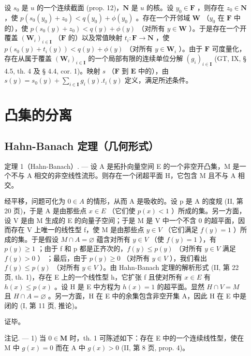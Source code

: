 设 \(s_0\) 是 \(u\) 的一个连续截面 (prop. 12)，\(\mathbf{N}\) 是 \(u\) 的核。设 \(y_0 \in \mathbf{F}\) ，则存在 \(z_0 \in \mathbf{N}\) ，使 \(p(s_0(y_0) + z_0) < q(y_0) + \phi(y_0)\) 。存在一个开邻域 \(\mathbf{W}\) （\(y_0\) 在 \(\mathbf{F}\) 中的），使 \(p(s_0(y) + z_0) < q(y) + \phi(y)\) （对所有 \(y \in \mathbf{W}\) ）。于是存在一个开覆盖 \((\mathbf{W}_i)_{i \in \mathbf{I}}\) （\(\mathbf{F}\) 的）以及常值映射 \(t_i: \mathbf{F} \to \mathbf{N}\) ，使 \(p(s_0(y) + t_i(y)) < q(y) + \phi(y)\) （对所有 \(y \in \mathbf{W}_i\) ）。由于 \(\mathbf{F}\) 可度量化，存在从属于覆盖 \((\mathbf{W}_i)_{i \in \mathbf{I}}\) 的一个局部有限的连续单位分解 \((g_i)_{i \in \mathbf{I}}\) (GT, IX, § 4.5, th. 4 及 § 4.4, cor. 1)。映射 \(s\) （\(\mathbf{F}\) 到 \(\mathbf{E}\) 中的），由 \(s(y) = s_0(y) + \sum_{i \in \mathbf{I}} g_i(y). t_i(y)\) 定义，满足所述条件。

\section{凸集的分离}

\subsection{Hahn-Banach 定理（几何形式）}

定理 1（Hahn-Banach）. --- 设 A 是拓扑向量空间 E 的一个非空开凸集，M 是一个不与 A 相交的非空线性流形。则存在一个闭超平面 H，它包含 M 且不与 A 相交。

经平移，问题可化为 \(0 \in A\) 的情形，从而 A 是吸收的。设 p 是 A 的度规 (II, 第 20 页)，于是 A 是由那些点 \(x \in E\) （它们使 \(p(x) < 1\) ）所成的集。另一方面，设 V 是由 M 生成的 E 的向量子空间；于是 M 是 V 中一个不含 0 的超平面，因而存在 V 上唯一的线性型 f，使 M 是由那些点 \(y \in V\) （它们满足 \(f(y) = 1\) ）所成的集。于是假设 \(M \cap A = \varnothing\) 蕴含对所有 \(y \in V\) （使 \(f(y) = 1\) ），有 \(p(y) \geqslant 1\) ；由于 f 和 p 都是正齐次的，\(f(y) \leqslant p(y)\) （对所有 \(y \in V\) 满足 \(f(y) > 0\) ） ；最后，由于 \(p(y) \geqslant 0\) （对所有 \(y \in V\) ），我们看出 \(f(y) \leqslant p(y)\) （对所有 \(y \in V\) ）。由 Hahn-Banach 定理的解析形式 (II, 第 22 页, th. 1)，存在 E 上的一个线性型 h，它扩张 f 且使对所有 \(x \in E\) 有 \(h(x) \leqslant p(x)\) 。设 H 是 E 中方程为 \(h(x) = 1\) 的超平面。显然 \(H \cap V = M\) 且 \(H \cap A = \varnothing\) 。另一方面，H 在 E 中的余集包含非空开集 A，因此 H 在 E 中是闭的 (I, 第 11 页, 推论)。

证毕。

注记. --- 1) 当 \(0 \in \mathbf{M}\) 时，th. 1 可陈述如下：存在 E 中的一个连续线性型，使在 M 中 \(g(x) = 0\) 而在 A 中 \(g(x) > 0\) (II, 第 8 页, prop. 4)。

